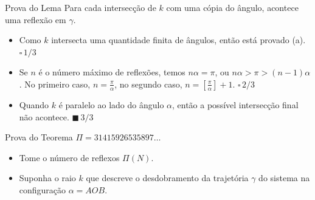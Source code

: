 \documentclass{beamer}
\begin{document}
\begin{frame}{Prova do Lema}
  Para cada intersecção de $k$ com uma cópia do ângulo, acontece uma reflexão em $\gamma$.
  
  \begin{itemize}
    \item Como $k$ intersecta uma quantidade finita de ângulos, então está provado (a). $\square \, 1/3$
    \item Se $n$ é o número máximo de reflexões, temos $n\alpha=\pi$, ou $n\alpha >\pi>(n-1)\alpha$. No primeiro caso, $n = \frac{\pi}{\alpha}$, no segundo caso, $n = [\frac{\pi}{\alpha}]+1$. $\square \, 2/3$
    \item Quando $k$ é paralelo ao lado do ângulo $\alpha$, então a possível intersecção final não acontece. $\blacksquare \, 3/3$
  \end{itemize}

\end{frame}

\begin{frame}{Prova do Teorema $\Pi=31415926535897\dots$}
    \begin{itemize}
      \item Tome o número de reflexos $\Pi(N)$.
      \item Suponha o raio $k$ que descreve o desdobramento da trajetória $\gamma$ do sistema na configuração $\alpha = AOB$.
    \end{itemize}
\end{frame}
\end{document}
